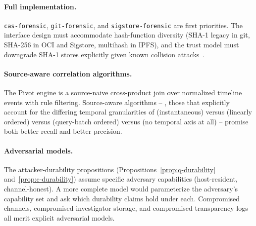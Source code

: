 \paragraph{Full  implementation.} \texttt{cas-forensic},
\texttt{git-forensic}, and \texttt{sigstore-forensic} are first priorities.
The interface design must accommodate hash-function diversity (SHA-1
legacy in git, SHA-256 in OCI and Sigstore, multihash in IPFS), and the
trust model must downgrade SHA-1 stores explicitly given known collision
attacks~\cite{stevens2017sha1}.

\paragraph{Source-aware correlation algorithms.} The Pivot engine is a
source-naive cross-product join over normalized timeline events with rule
filtering. Source-aware algorithms -- \eg{}, those that explicitly account
for the differing temporal granularities of  (instantaneous) versus
 (linearly ordered) versus  (query-batch ordered) versus
 (no temporal axis at all) -- promise both better recall and better
precision.

\paragraph{Adversarial models.} The attacker-durability propositions
(Propositions~\ref{prop:q-durability} and~\ref{prop:c-durability}) assume
specific adversary capabilities (host-resident, channel-honest). A more
complete model would parameterize the adversary's capability set and ask
which durability claims hold under each. Compromised channels, compromised
investigator storage, and compromised transparency logs all merit explicit
adversarial models.
